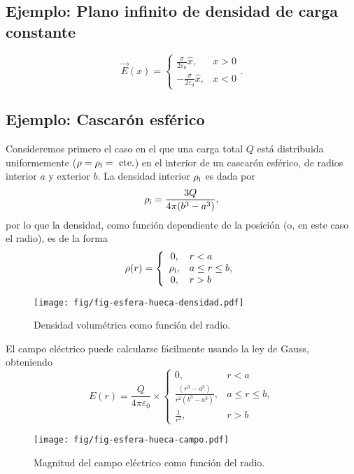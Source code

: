 \subsection{Ejemplo: Plano infinito de densidad de carga constante}
\begin{equation}
\vec{E}(x)=\left\{\begin{array}{rl}\frac{\sigma}{2\varepsilon_0}\hat{x},& x>0 \\
-\frac{\sigma}{2\varepsilon_0}\hat{x},& x<0 \end{array}\right. .
\end{equation}

\subsection{Ejemplo: Cascarón esférico}
Consideremos primero el caso en el que una carga total $Q$ está distribuida uniformemente ($\rho=\rho_{\rm i}=\text{ cte.}$) en el interior de un cascarón esférico, de radios interior $a$ y exterior $b$.
La densidad interior $\rho_{\rm i}$ es dada por
\begin{equation}
\rho_{\rm i} = \frac{3Q}{4\pi(b^3-a^3)},
\end{equation}
por lo que la densidad, como función dependiente de la posición (o, en este caso el radio), es de la forma
\begin{equation}
\rho(r)=\left\{\begin{array}{cl}
0, & r<a\\
\rho_{\rm i}, & a\le r\le b,\\
0, & r>b
\end{array}\right.
\end{equation}
\begin{figure}[!h]
\centerline{\texttt{[image: fig/fig-esfera-hueca-densidad.pdf]}}
\caption{Densidad volumétrica como función del radio.}
\label{fig_ehd}
\end{figure}
El campo eléctrico puede calcularse fácilmente usando la ley de Gauss, obteniendo
\begin{equation}
E(r)=\frac{Q}{4\pi\varepsilon_0}\times\left\{\begin{array}{cl}
0, & r<a\\
\frac{(r^3-a^3)}{r^2(b^3-a^3)}, & a\le r\le b,\\
\frac{1}{r^2}, & r>b
\end{array}\right.
\end{equation}
\begin{figure}[!h]
\centerline{\texttt{[image: fig/fig-esfera-hueca-campo.pdf]}}
\caption{Magnitud del campo eléctrico como función del radio.}
\label{fig_ehc}
\end{figure}


